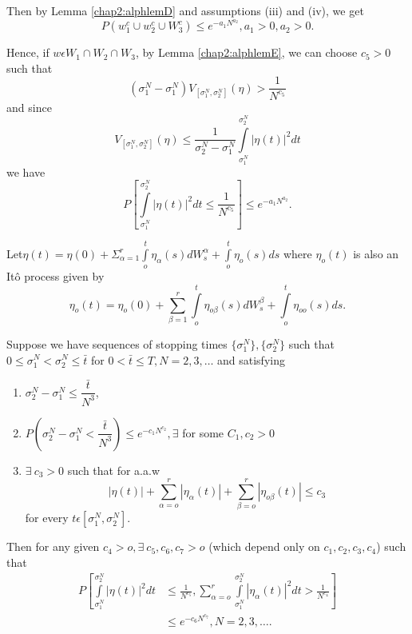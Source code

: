   Then by Lemma \ref{chap2:alphlemD} and assumptions (iii) and (iv), we get
  $$
  P\left(w_1^c \cup w_2^c \cup W_3^c \right) \leq e^{-a_{1}N^{a_2}}, a_1>0, a_2>0.
  $$
  
  Hence, if $w \epsilon  W_1 \cap W_2 \cap W_3$, by Lemma
  \ref{chap2:alphlemE}, we 
  can choose $c_5 > 0 $ such that  
  $$
  \left(\sigma_1^N - \sigma_1^N \right) V_{[\sigma_1^N, \sigma_2^N]
  }(\eta ) > \frac{1}{N^{c_{5}}} 
  $$
  and since
  $$
  V_{[ \sigma_1^N, \sigma_2 ^N]} (\eta) \leq \frac{1}{\sigma_2^N
    - \sigma_1^N}\int\limits_{\sigma _1 ^N}^{\sigma_2 ^N} | \eta (t) |^2 dt 
  $$
  we have 
  $$
  P\left[ \int\limits_{\sigma_1^N}^{\sigma^N_2}| \eta (t) |^2 dt \leq
    \frac{1}{N^{c_{5}}}\right] \leq e^{-a_{1}N^{a_{2}}}. 
  $$

\medskip
{}
  Let\pageoriginale $\eta (t) = \eta (0) +  \Sigma_{\alpha = 1}^r
  \int\limits_o ^t \eta_ 
  {\alpha} (s) dW_{s}^{\alpha} + \int\limits_{ o }^{t} \eta_{o} (s) ds$ 
  where  $\eta_o (t) $ is also an It\^{o} process given by
  $$
  \eta_{o}(t)=\eta_o (0) + \sum_{ \beta = 1}^{r} \int\limits_{o}^{t}
  \eta_{o \beta} (s) dW_s^{\beta} + \int\limits_o^t \eta_{oo}(s) ds. 
  $$

  Suppose we have sequences of stopping times $\{ \sigma _1 ^N\}, \{
  \sigma_2^N\}$ such that  $0 \leq \sigma_1 ^N < \sigma_2 ^N \leq
  \bar{t}$ for $0 < \bar{t} \leq T, N = 2,3, \ldots $ and satisfying
    \begin{enumerate}[\rm (i)]
  \item $\sigma _2 ^N - \sigma_1 ^N \leq \dfrac{\bar{t}}{N^3}$,

  \item $P \left(\sigma_2 ^N - \sigma _1^N < \dfrac{\bar{t}}{N^3}\right) \leq
    e^{-c_{1}N^{c_{2}}}, \exists $ for some $C_1,  c_2 > 0$ 

  \item $\exists~ c_3 > 0 $ such that for a.a.w
    $$
    | \eta(t) | + \sum_{\alpha = o}^{r} | \eta _{\alpha} (t) | +
    \sum_{\beta=o}^{r}| \eta _{o \beta }(t)| \leq c_3 
    $$
    for every $t \epsilon  \left[ \sigma_1 ^N,  \sigma_2^N\right]$.
  \end{enumerate}

Then for any given $c_4 > o, \exists~ c_5, c_6, c_7 > o$  (which
depend only on $c_1, c_2, c_3, c_4$) such that  
\begin{align*}
  P\left[\int\limits_{\sigma_{1}^{N}}^{\sigma_{2}^{N}} | \eta (t) |^2 dt
    \right. & \left. \leq \frac{1}{N^{c_{5}}}, \sum_{\alpha = o}^{r}
    \int\limits_{\sigma_{1}^{N}}^{\sigma _{2}^{N}} | \eta _{\alpha}
    (t) |^2 dt > \frac{1}{N^{c_{4}}}\right] \\ 
  &\leq e^{-c_{6}N^{c_{7}}}, N = 2, 3, \ldots.
\end{align*}


